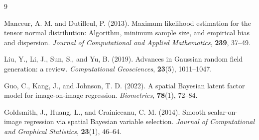 
\begin{thebibliography}{9}

Manceur, A. M. and Dutilleul, P. (2013).
Maximum likelihood estimation for the tensor normal distribution:
Algorithm, minimum sample size, and empirical bias and dispersion.
\textit{Journal of Computational and Applied Mathematics}, \textbf{239}, 37--49.

Liu, Y., Li, J., Sun, S., and Yu, B. (2019).
Advances in Gaussian random field generation: a review.
\textit{Computational Geosciences}, \textbf{23}(5), 1011--1047.

Guo, C., Kang, J., and Johnson, T. D. (2022).
A spatial Bayesian latent factor model for image-on-image regression.
\textit{Biometrics}, \textbf{78}(1), 72--84.

Goldsmith, J., Huang, L., and Crainiceanu, C. M. (2014).
Smooth scalar-on-image regression via spatial Bayesian variable selection.
\textit{Journal of Computational and Graphical Statistics}, \textbf{23}(1), 46--64.

\end{thebibliography}
